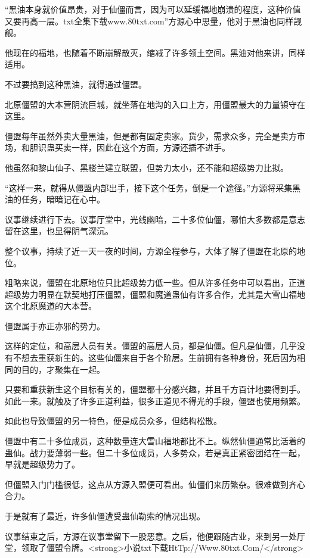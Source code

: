 
\begin{this_body}

“黑油本身就价值昂贵，对于仙僵而言，因为可以延缓福地崩溃的程度，这种价值又要再高一层。txt全集下载www.80txt.com”方源心中思量，他对于黑油也同样觊觎。

他现在的福地，也随着不断崩解散灭，缩减了许多领土空间。黑油对他来讲，同样适用。

不过要搞到这种黑油，就得通过僵盟。

北原僵盟的大本营阴流巨城，就坐落在地沟的入口上方，用僵盟最大的力量镇守在这里。

僵盟每年虽然外卖大量黑油，但是都有固定卖家。货少，需求众多，完全是卖方市场，和胆识蛊买卖一样，因此在这个方面，方源还插不进手。

他虽然和黎山仙子、黑楼兰建立联盟，但势力太小，还不能和超级势力比拟。

“这样一来，就得从僵盟内部出手，接下这个任务，倒是一个途径。”方源将采集黑油的任务，暗暗记在心中。

议事继续进行下去。议事厅堂中，光线幽暗，二十多位仙僵，哪怕大多数都是意志留在这里，也显得阴气深沉。

整个议事，持续了近一天一夜的时间，方源全程参与，大体了解了僵盟在北原的地位。

粗略来说，僵盟在北原地位只比超级势力低一些。但从许多任务中可以看出，正道超级势力明显在默契地打压僵盟，僵盟和魔道蛊仙有许多合作，尤其是大雪山福地这个北原魔道的大本营。

僵盟属于亦正亦邪的势力。

这样的定位，和高层人员有关。僵盟的高层人员，都是仙僵。但凡是仙僵，几乎没有不想去重获新生的。这些仙僵来自于各个阶层。生前拥有各种身份，死后因为相同的目的，才聚集在一起。

只要和重获新生这个目标有关的，僵盟都十分感兴趣，并且千方百计地要得到手。如此一来。就触及了许多正道利益，很多正道见不得光的手段，僵盟也使用频繁。

如此也导致僵盟的另一特色，便是成员众多，但结构松散。

僵盟中有二十多位成员，这种数量连大雪山福地都比不上。纵然仙僵通常比活着的蛊仙。战力要薄弱一些。但二十多位成员，人多势众，若是真正紧密团结在一起，早就是超级势力了。

但僵盟入门门槛很低，这点从方源入盟便可看出。仙僵们来历繁杂。很难做到齐心合力。

于是就有了最近，许多仙僵遭受蛊仙勒索的情况出现。

议事结束之后，方源在议事堂留下一股恶意。之后，他便跟随古业，来到另一处厅堂，领取了僵盟令牌。<strong>小说txt下载HtTp://Www.80txt.Com/</strong>


\end{this_body}
